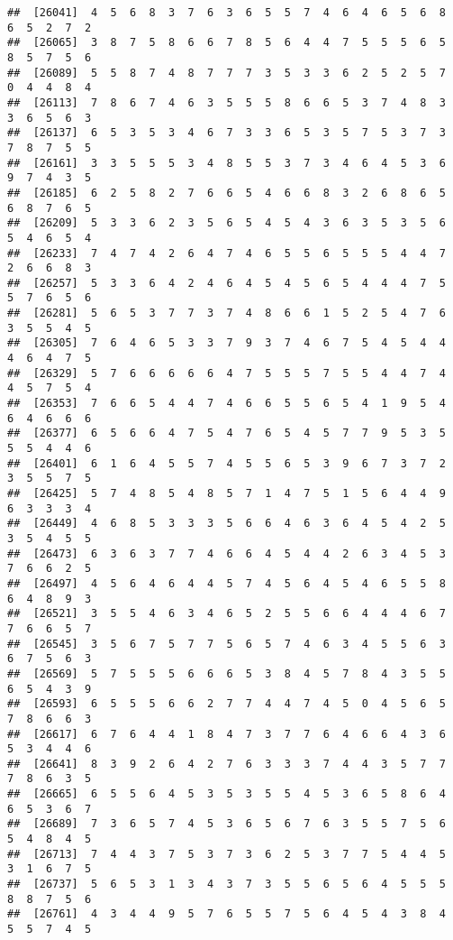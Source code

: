 \documentclass[
]{book}
\begin{document}
\begin{verbatim}
##  [26041]  4  5  6  8  3  7  6  3  6  5  5  7  4  6  4  6  5  6  8  6  5  2  7  2
##  [26065]  3  8  7  5  8  6  6  7  8  5  6  4  4  7  5  5  5  6  5  8  5  7  5  6
##  [26089]  5  5  8  7  4  8  7  7  7  3  5  3  3  6  2  5  2  5  7  0  4  4  8  4
##  [26113]  7  8  6  7  4  6  3  5  5  5  8  6  6  5  3  7  4  8  3  3  6  5  6  3
##  [26137]  6  5  3  5  3  4  6  7  3  3  6  5  3  5  7  5  3  7  3  7  8  7  5  5
##  [26161]  3  3  5  5  5  3  4  8  5  5  3  7  3  4  6  4  5  3  6  9  7  4  3  5
##  [26185]  6  2  5  8  2  7  6  6  5  4  6  6  8  3  2  6  8  6  5  6  8  7  6  5
##  [26209]  5  3  3  6  2  3  5  6  5  4  5  4  3  6  3  5  3  5  6  5  4  6  5  4
##  [26233]  7  4  7  4  2  6  4  7  4  6  5  5  6  5  5  5  4  4  7  2  6  6  8  3
##  [26257]  5  3  3  6  4  2  4  6  4  5  4  5  6  5  4  4  4  7  5  5  7  6  5  6
##  [26281]  5  6  5  3  7  7  3  7  4  8  6  6  1  5  2  5  4  7  6  3  5  5  4  5
##  [26305]  7  6  4  6  5  3  3  7  9  3  7  4  6  7  5  4  5  4  4  4  6  4  7  5
##  [26329]  5  7  6  6  6  6  6  4  7  5  5  5  7  5  5  4  4  7  4  4  5  7  5  4
##  [26353]  7  6  6  5  4  4  7  4  6  6  5  5  6  5  4  1  9  5  4  6  4  6  6  6
##  [26377]  6  5  6  6  4  7  5  4  7  6  5  4  5  7  7  9  5  3  5  5  5  4  4  6
##  [26401]  6  1  6  4  5  5  7  4  5  5  6  5  3  9  6  7  3  7  2  3  5  5  7  5
##  [26425]  5  7  4  8  5  4  8  5  7  1  4  7  5  1  5  6  4  4  9  6  3  3  3  4
##  [26449]  4  6  8  5  3  3  3  5  6  6  4  6  3  6  4  5  4  2  5  3  5  4  5  5
##  [26473]  6  3  6  3  7  7  4  6  6  4  5  4  4  2  6  3  4  5  3  7  6  6  2  5
##  [26497]  4  5  6  4  6  4  4  5  7  4  5  6  4  5  4  6  5  5  8  6  4  8  9  3
##  [26521]  3  5  5  4  6  3  4  6  5  2  5  5  6  6  4  4  4  6  7  7  6  6  5  7
##  [26545]  3  5  6  7  5  7  7  5  6  5  7  4  6  3  4  5  5  6  3  6  7  5  6  3
##  [26569]  5  7  5  5  5  6  6  6  5  3  8  4  5  7  8  4  3  5  5  6  5  4  3  9
##  [26593]  6  5  5  5  6  6  2  7  7  4  4  7  4  5  0  4  5  6  5  7  8  6  6  3
##  [26617]  6  7  6  4  4  1  8  4  7  3  7  7  6  4  6  6  4  3  6  5  3  4  4  6
##  [26641]  8  3  9  2  6  4  2  7  6  3  3  3  7  4  4  3  5  7  7  7  8  6  3  5
##  [26665]  6  5  5  6  4  5  3  5  3  5  5  4  5  3  6  5  8  6  4  6  5  3  6  7
##  [26689]  7  3  6  5  7  4  5  3  6  5  6  7  6  3  5  5  7  5  6  5  4  8  4  5
##  [26713]  7  4  4  3  7  5  3  7  3  6  2  5  3  7  7  5  4  4  5  3  1  6  7  5
##  [26737]  5  6  5  3  1  3  4  3  7  3  5  5  6  5  6  4  5  5  5  8  8  7  5  6
##  [26761]  4  3  4  4  9  5  7  6  5  5  7  5  6  4  5  4  3  8  4  5  5  7  4  5

\end{verbatim}
\end{document}
